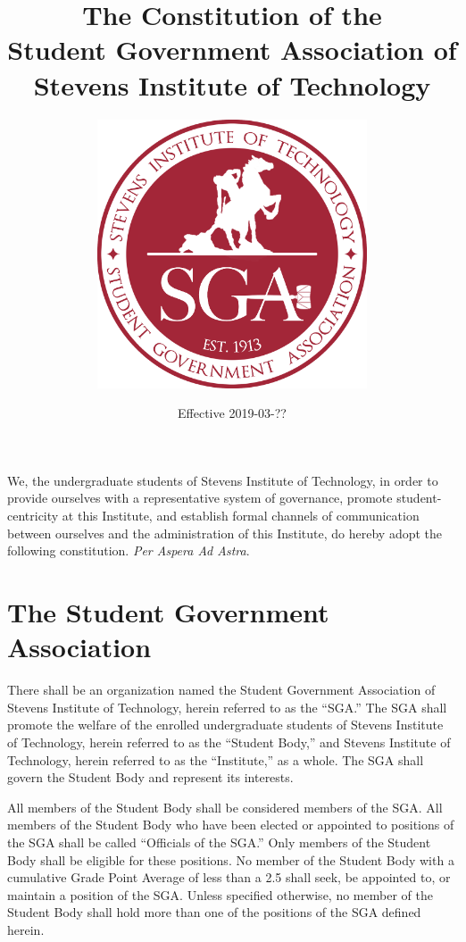 \documentclass[12pt,oneside]{scrreprt}
\begin{document}
\title{The Constitution of the \\ Student Government Association of \\ Stevens Institute of Technology}
\subtitle{
    \vspace{1cm}
    \includegraphics[width=0.6\textwidth]{logo}
}
\date{Effective 2019-03-??}
\maketitle

\tableofcontents

\modulolinenumbers[1]
\linenumbers

We, the undergraduate students of Stevens Institute of Technology, in order to provide ourselves with a representative system of governance, promote student-centricity at this Institute, and establish formal channels of communication between ourselves and the administration of this Institute, do hereby adopt the following constitution. \textit{Per Aspera Ad Astra}.

\chapter{The Student Government Association}
There shall be an organization named the Student Government Association of Stevens Institute of Technology, herein referred to as the ``SGA.'' The SGA shall promote the welfare of the enrolled undergraduate students of Stevens Institute of Technology, herein referred to as the ``Student Body,'' and Stevens Institute of Technology, herein referred to as the ``Institute,'' as a whole. The SGA shall govern the Student Body and represent its interests.

All members of the Student Body shall be considered members of the SGA. All members of the Student Body who have been elected or appointed to positions of the SGA shall be called ``Officials of the SGA.'' Only members of the Student Body shall be eligible for these positions. No member of the Student Body with a cumulative Grade Point Average of less than a 2.5 shall seek, be appointed to, or maintain a position of the SGA. Unless specified otherwise, no member of the Student Body shall hold more than one of the positions of the SGA defined herein.
\end{document}
